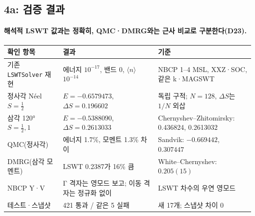 \subsection{4a: 검증 결과}\label{stage4a-verification}
\begingroup%
  \framesubtitle{해석적 LSWT 값과는 정확히, QMC·DMRG와는 근사 비교로 구분한다(D23).}
  \footnotesize\renewcommand{\arraystretch}{1.08}
  \begin{tabularx}{\textwidth}{@{}P{3.1cm}P{3.3cm}Y@{}}
    \toprule
    확인 항목 & 결과 & 기준 \\
    \midrule
    기존 \texttt{LSWTSolver} 재현 & 에너지 $10^{-17}$, 밴드 0, $\langle n\rangle$ $10^{-14}$ & NBCP 1--4 MSL, XXZ·SOC, 같은 k·MAGSWT \\
    정사각 Néel $S=\tfrac12$ & $E=-0.6579473$, $\Delta S=0.196602$ & 독립 구적; $N=128$, $\Delta S$는 $1/N$ 외삽 \\
    삼각 120° $S=\tfrac12,1$ & $E=-0.5388090$, $\Delta S=0.2613033$ & Chernyshev–Zhitomirsky: 0.436824, 0.2613032 \\
    QMC(정사각) & 에너지 1.7\%, 모멘트 1.3\% 차이 & Sandvik: $-0.669442$, $0.307447$ \\
    DMRG(삼각 모멘트) & LSWT 0.2387가 16\% 큼 & White–Chernyshev: $0.205(15)$ \\
    NBCP Y·V & Γ 격자는 영모드 보고; 이동 격자는 정규화 없이 & LSWT 차수의 우연 영모드 \\
    테스트·스냅샷 & 421 통과 / 같은 5 실패 & 새 17개; 스냅샷 차이 0 \\
    \bottomrule
  \end{tabularx}
\endgroup



